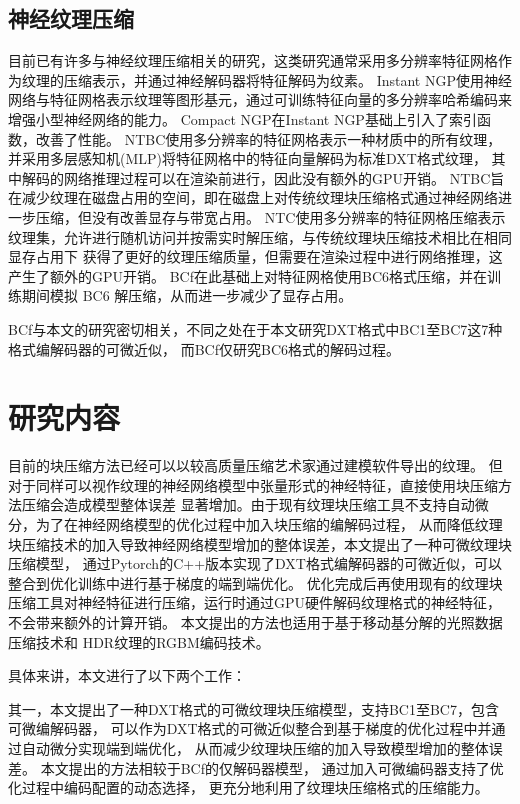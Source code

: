 \subsection{神经纹理压缩}

目前已有许多与神经纹理压缩相关的研究，这类研究通常采用多分辨率特征网格作为纹理的压缩表示，并通过神经解码器将特征解码为纹素。
Instant NGP\cite{muller2022instant}使用神经网络与特征网格表示纹理等图形基元，通过可训练特征向量的多分辨率哈希编码来增强小型神经网络的能力。
Compact NGP\cite{takikawa2023compact}在Instant NGP基础上引入了索引函数，改善了性能。
NTBC\cite{fujieda2024neural}使用多分辨率的特征网格表示一种材质中的所有纹理，并采用多层感知机(MLP)将特征网格中的特征向量解码为标准DXT格式纹理，
其中解码的网络推理过程可以在渲染前进行，因此没有额外的GPU开销。
NTBC旨在减少纹理在磁盘占用的空间，即在磁盘上对传统纹理块压缩格式通过神经网络进一步压缩，但没有改善显存与带宽占用。
NTC\cite{vaidyanathan2023random}使用多分辨率的特征网格压缩表示纹理集，允许进行随机访问并按需实时解压缩，与传统纹理块压缩技术相比在相同显存占用下
获得了更好的纹理压缩质量，但需要在渲染过程中进行网络推理，这产生了额外的GPU开销。
BCf\cite{weinreich2024real}在此基础上对特征网格使用BC6格式压缩，并在训练期间模拟 BC6 解压缩，从而进一步减少了显存占用。

BCf\cite{weinreich2024real}与本文的研究密切相关，不同之处在于本文研究DXT格式中BC1至BC7这7种格式编解码器的可微近似，
而BCf\cite{weinreich2024real}仅研究BC6格式的解码过程。

\section{研究内容}

目前的块压缩方法已经可以以较高质量压缩艺术家通过建模软件导出的纹理。
但对于同样可以视作纹理的神经网络模型中张量形式的神经特征，直接使用块压缩方法压缩会造成模型整体误差
显著增加。由于现有纹理块压缩工具不支持自动微分，为了在神经网络模型的优化过程中加入块压缩的编解码过程，
从而降低纹理块压缩技术的加入导致神经网络模型增加的整体误差，本文提出了一种可微纹理块压缩模型，
通过Pytorch的C++版本实现了DXT格式编解码器的可微近似，可以整合到优化训练中进行基于梯度的端到端优化。
优化完成后再使用现有的纹理块压缩工具对神经特征进行压缩，运行时通过GPU硬件解码纹理格式的神经特征，
不会带来额外的计算开销。
本文提出的方法也适用于基于移动基分解的光照数据压缩技术\cite{silvennoinen2021moving}和
HDR纹理的RGBM编码技术。

具体来讲，本文进行了以下两个工作：

其一，本文提出了一种DXT格式的可微纹理块压缩模型，支持BC1至BC7，包含可微编解码器，
可以作为DXT格式的可微近似整合到基于梯度的优化过程中并通过自动微分实现端到端优化，
从而减少纹理块压缩的加入导致模型增加的整体误差。
本文提出的方法相较于BCf\cite{weinreich2024real}的仅解码器模型，
通过加入可微编码器支持了优化过程中编码配置的动态选择，
更充分地利用了纹理块压缩格式的压缩能力。

